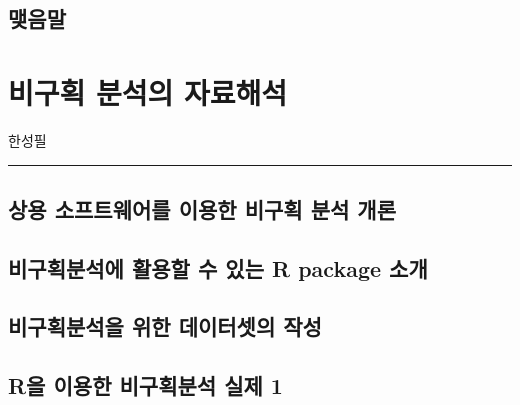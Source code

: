 \documentclass[
  11pt,
  krantz2, a4paper, twoside]{krantz}
\begin{document}
\hypertarget{uxb9fauxc74cuxb9d0-1}{%
\section{맺음말}\label{uxb9fauxc74cuxb9d0-1}}

\hypertarget{nca-analysis}{%
\chapter{비구획 분석의 자료해석}\label{nca-analysis}}

\Large\hfill

한성필
\normalsize

\begin{center}\rule{0.5\linewidth}{0.5pt}\end{center}

\hypertarget{uxc0c1uxc6a9-uxc18cuxd504uxd2b8uxc6e8uxc5b4uxb97c-uxc774uxc6a9uxd55c-uxbe44uxad6cuxd68d-uxbd84uxc11d-uxac1cuxb860}{%
\section{상용 소프트웨어를 이용한 비구획 분석 개론}\label{uxc0c1uxc6a9-uxc18cuxd504uxd2b8uxc6e8uxc5b4uxb97c-uxc774uxc6a9uxd55c-uxbe44uxad6cuxd68d-uxbd84uxc11d-uxac1cuxb860}}

\hypertarget{uxbe44uxad6cuxd68duxbd84uxc11duxc5d0-uxd65cuxc6a9uxd560-uxc218-uxc788uxb294-r-package-uxc18cuxac1c}{%
\section{비구획분석에 활용할 수 있는 R package 소개}\label{uxbe44uxad6cuxd68duxbd84uxc11duxc5d0-uxd65cuxc6a9uxd560-uxc218-uxc788uxb294-r-package-uxc18cuxac1c}}

\hypertarget{uxbe44uxad6cuxd68duxbd84uxc11duxc744-uxc704uxd55c-uxb370uxc774uxd130uxc14buxc758-uxc791uxc131}{%
\section{비구획분석을 위한 데이터셋의 작성}\label{uxbe44uxad6cuxd68duxbd84uxc11duxc744-uxc704uxd55c-uxb370uxc774uxd130uxc14buxc758-uxc791uxc131}}

\hypertarget{ruxc744-uxc774uxc6a9uxd55c-uxbe44uxad6cuxd68duxbd84uxc11d-uxc2e4uxc81c-1}{%
\section{R을 이용한 비구획분석 실제 1}\label{ruxc744-uxc774uxc6a9uxd55c-uxbe44uxad6cuxd68duxbd84uxc11d-uxc2e4uxc81c-1}}
\end{document}
